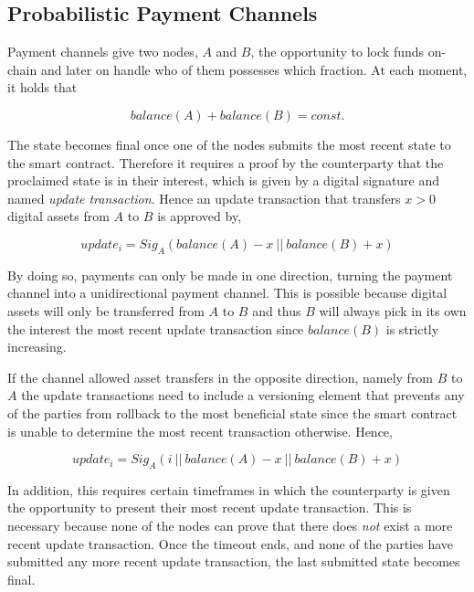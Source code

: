 \subsection{Probabilistic Payment Channels}
\label{sec:incentives:probabilistic}

Payment channels give two nodes, $A$ and $B$, the opportunity to lock funds on-chain and later on handle who of them possesses which fraction. At each moment, it holds that

$$ balance(A) + balance(B) = const. $$

The state becomes final once one of the nodes submits the most recent state to the smart contract. Therefore it requires a proof by the counterparty that the proclaimed state is in their interest, which is given by a digital signature and named \textit{update transaction}. Hence an update transaction that transfers $x > 0$ digital assets from $A$ to $B$ is approved by,

$$ update_i = Sig_A (balance(A) - x \ || \ balance(B) + x) $$

By doing so, payments can only be made in one direction, turning the payment channel into a unidirectional payment channel. This is possible because digital assets will only be transferred from $A$ to $B$ and thus $B$ will always pick in its own the interest the most recent update transaction since $balance(B)$ is strictly increasing.

If the channel allowed asset transfers in the opposite direction, namely from $B$ to $A$ the update transactions need to include a versioning element that prevents any of the parties from rollback to the most beneficial state since the smart contract is unable to determine the most recent transaction otherwise. Hence,

$$ update_i = Sig_A (i \ || \ balance(A) - x \ || \ balance(B) + x) $$

In addition, this requires certain timeframes in which the counterparty is given the opportunity to present their most recent update transaction. This is necessary because none of the nodes can prove that there does \textit{not} exist a more recent update transaction. Once the timeout ends, and none of the parties have submitted any more recent update transaction, the last submitted state becomes final.

